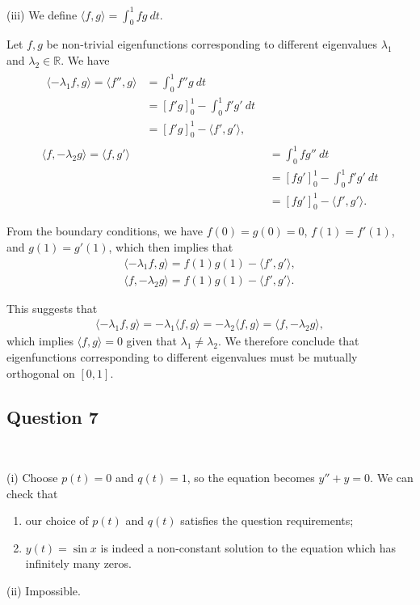 \documentclass[12pt]{amsart}
\theoremstyle{plain}
\theoremstyle{definition}
\def\mb{\mathbb}
\newcommand{\lsq}{\langle}
\newcommand{\rsq}{\rangle}
\begin{document}
(iii) We define $\displaystyle \lsq f,g\rsq=\int_{0}^1fg\ dt$.

Let $f,g$ be non-trivial eigenfunctions corresponding to different eigenvalues $\lambda_1$ and $\lambda_2\in\mb R$. We have
\begin{align*}
\begin{split}
	\lsq -\lambda_1 f,g\rsq=\lsq f'',g\rsq&=\int_{0}^1f''g\ dt\\
	&=\left[f'g\right]_{0}^1-\int_{0}^1f'g'\ dt\\
	&=\left[f'g\right]_{0}^1-\lsq f',g'\rsq,
\end{split}\\
	\lsq  f,-\lambda_2g\rsq=\lsq f,g'\rsq&=\int_{0}^1fg''\ dt\\
	&=\left[fg'\right]_{0}^1-\int_{0}^1f'g'\ dt\\
	&=\left[fg'\right]_{0}^1-\lsq f',g'\rsq.
\end{align*}

From the boundary conditions, we have $f(0)=g(0)=0$, $f(1)=f'(1)$, and $g(1)=g'(1)$, which then implies that
\begin{align*}
	\lsq -\lambda_1 f,g\rsq=f(1)g(1)-\lsq f',g'\rsq,\\
	\lsq f, -\lambda_2g\rsq=f(1)g(1)-\lsq f',g'\rsq.
\end{align*}

This suggests that 
\begin{align*}
	\lsq -\lambda_1f,g\rsq=-\lambda_1\lsq f,g\rsq=-\lambda_2\lsq f,g\rsq=\lsq f,-\lambda_2g\rsq,
\end{align*}
which implies $\lsq f,g\rsq=0$ given that $\lambda_1\neq\lambda_2$. We therefore conclude that eigenfunctions corresponding to different eigenvalues must be mutually orthogonal on $[0,1]$.

\subsection*{Question 7} \ 

(i) Choose $p(t)=0$ and $q(t)=1$, so the equation becomes $y''+y=0$. We can check that 
\begin{enumerate}
	\item our choice of $p(t)$ and $q(t)$ satisfies the question requirements;
	\item $y(t)=\sin x$ is indeed a non-constant solution to the equation which has infinitely many zeros.
\end{enumerate}

(ii) Impossible.
\end{document}
